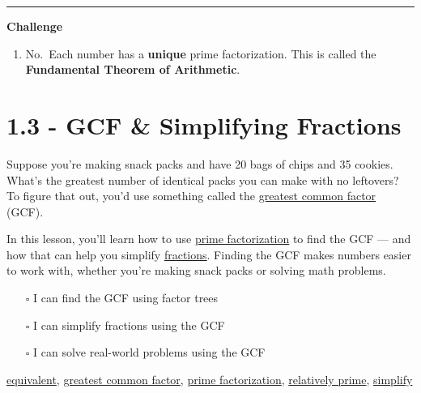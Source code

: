 \documentclass[
  letterpaper,
  DIV=11,
  numbers=noendperiod]{scrreprt}
\providecommand{\tightlist}{%
  \setlength{\itemsep}{0pt}\setlength{\parskip}{0pt}}
\begin{document}
\begin{center}\rule{0.5\linewidth}{0.5pt}\end{center}

\textbf{Challenge}

\begin{enumerate}
\def\labelenumi{\arabic{enumi}.}
\setcounter{enumi}{5}
\tightlist
\item
  No.~Each number has a \textbf{unique} prime factorization. This is
  called the \textbf{Fundamental Theorem of Arithmetic}.
\end{enumerate}

\chapter*{1.3 - GCF \& Simplifying
Fractions}\label{gcf-simplifying-fractions}


Suppose you're making snack packs and have 20 bags of chips and 35
cookies. What's the greatest number of identical packs you can make with
no leftovers? To figure that out, you'd use something called the
\href{./glossary.html\#glossary-greatest-common-factor}{greatest common factor}
(GCF).

In this lesson, you'll learn how to use
\href{./glossary.html\#glossary-prime-factorization}{prime factorization}
to find the GCF --- and how that can help you simplify
\href{./glossary.html\#glossary-fraction}{fractions}. Finding the GCF
makes numbers easier to work with, whether you're making snack packs or
solving math problems.

\begin{itemize}
\tightlist
\item[$\square$]
  I can find the GCF using factor trees
\item[$\square$]
  I can simplify fractions using the GCF
\item[$\square$]
  I can solve real-world problems using the GCF
\end{itemize}

\href{./glossary.html\#glossary-equivalent}{equivalent},
\href{./glossary.html\#glossary-greatest-common-factor}{greatest common factor},
\href{./glossary.html\#glossary-prime-factorization}{prime factorization},
\href{./glossary.html\#glossary-relatively-prime}{relatively prime},
\href{./glossary.html\#glossary-simplify}{simplify}
\end{document}
